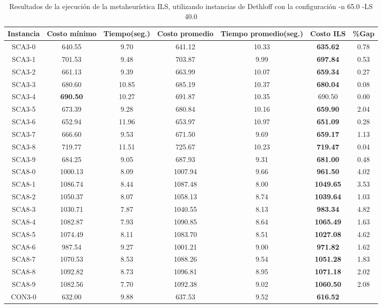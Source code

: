 \begin{table}[ht]
\caption{Resultados de la ejecución de la metaheurística ILS, utilizando instancias de Dethloff con la configuración -n 65.0 -LS 40.0}
\centering
\small
\begin{tabular}{c c c c c c c}
\hline\hline
Instancia & Costo mínimo & Tiempo(seg.) & Costo promedio & Tiempo promedio(seg.) & Costo ILS & \%Gap \\ [0.5ex]
\hline
SCA3-0 & 640.55 & 9.70 & 
641.12 & 10.33 & \bf{635.62} & 
0.78\\SCA3-1 & 701.53 & 9.48 & 
703.87 & 9.99 & \bf{697.84} & 
0.53\\SCA3-2 & 661.13 & 9.39 & 
663.99 & 10.07 & \bf{659.34} & 
0.27\\SCA3-3 & 680.60 & 10.85 & 
685.19 & 10.37 & \bf{680.04} & 
0.08\\SCA3-4 & \bf{690.50} & 10.27 & 
691.87 & 10.35 & 690.50 & 0.00\\
SCA3-5 & 673.39 & 9.28 & 
680.84 & 10.16 & \bf{659.90} & 
2.04\\SCA3-6 & 652.94 & 11.96 & 
653.97 & 10.97 & \bf{651.09} & 
0.28\\SCA3-7 & 666.60 & 9.53 & 
671.50 & 9.69 & \bf{659.17} & 
1.13\\SCA3-8 & 719.77 & 11.51 & 
725.67 & 10.23 & \bf{719.47} & 
0.04\\SCA3-9 & 684.25 & 9.05 & 
687.93 & 9.31 & \bf{681.00} & 
0.48\\SCA8-0 & 1000.13 & 8.09 & 
1007.94 & 9.66 & \bf{961.50} & 
4.02\\SCA8-1 & 1086.74 & 8.44 & 
1087.48 & 8.00 & \bf{1049.65} & 
3.53\\SCA8-2 & 1050.37 & 8.07 & 
1058.13 & 8.74 & \bf{1039.64} & 
1.03\\SCA8-3 & 1030.71 & 7.87 & 
1040.55 & 8.13 & \bf{983.34} & 
4.82\\SCA8-4 & 1082.87 & 7.93 & 
1090.85 & 8.64 & \bf{1065.49} & 
1.63\\SCA8-5 & 1074.49 & 8.11 & 
1083.70 & 8.51 & \bf{1027.08} & 
4.62\\SCA8-6 & 987.54 & 9.27 & 
1001.21 & 9.00 & \bf{971.82} & 
1.62\\SCA8-7 & 1070.53 & 8.53 & 
1088.26 & 9.54 & \bf{1051.28} & 
1.83\\SCA8-8 & 1092.82 & 8.73 & 
1096.81 & 8.95 & \bf{1071.18} & 
2.02\\SCA8-9 & 1082.56 & 7.70 & 
1092.38 & 9.02 & \bf{1060.50} & 
2.08\\CON3-0 & 632.00 & 9.88 & 
637.53 & 9.52 & \bf{616.52} & 

\end{tabular}
\end{table}
